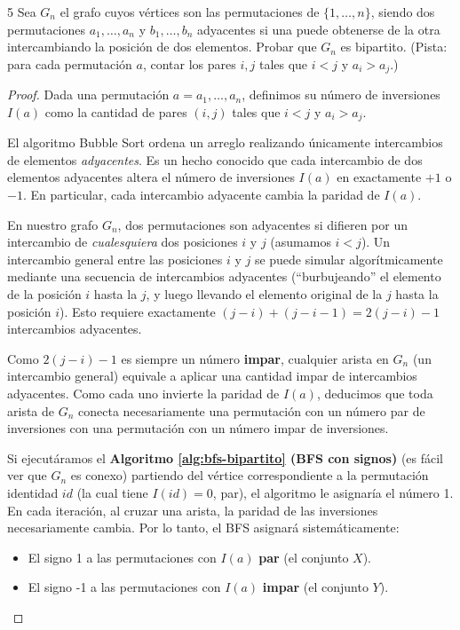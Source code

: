 \begin{ejercicio}{5}
    Sea \( G_n \) el grafo cuyos vértices son las permutaciones de \( \{1, \ldots, n\} \), siendo dos permutaciones \( a_1, \ldots, a_n \) y \( b_1, \ldots, b_n \) adyacentes si una puede obtenerse de la otra intercambiando la posición de dos elementos. Probar que \( G_n \) es bipartito. (Pista: para cada permutación \( a \), contar los pares \( i, j \) tales que \( i < j \) y \( a_i > a_j \).)
\end{ejercicio}
\begin{proof}
    Dada una permutación \(a = a_1, \ldots, a_n\), definimos su número de inversiones \( I(a) \) como la cantidad de pares \((i, j)\) tales que \(i < j\) y \(a_i > a_j\).

    El algoritmo Bubble Sort ordena un arreglo realizando únicamente intercambios de elementos \emph{adyacentes}. Es un hecho conocido que cada intercambio de dos elementos adyacentes altera el número de inversiones \(I(a)\) en exactamente \(+1\) o \(-1\). En particular, cada intercambio adyacente cambia la paridad de \(I(a)\).

    En nuestro grafo \(G_n\), dos permutaciones son adyacentes si difieren por un intercambio de \emph{cualesquiera} dos posiciones \(i\) y \(j\) (asumamos \(i < j\)). Un intercambio general entre las posiciones \(i\) y \(j\) se puede simular algorítmicamente mediante una secuencia de intercambios adyacentes (``burbujeando'' el elemento de la posición \(i\) hasta la \(j\), y luego llevando el elemento original de la \(j\) hasta la posición \(i\)). Esto requiere exactamente \((j-i) + (j-i-1) = 2(j-i) - 1\) intercambios adyacentes.

    Como \(2(j-i) - 1\) es siempre un número \textbf{impar}, cualquier arista en \(G_n\) (un intercambio general) equivale a aplicar una cantidad impar de intercambios adyacentes. Como cada uno invierte la paridad de \(I(a)\), deducimos que toda arista de \(G_n\) conecta necesariamente una permutación con un número par de inversiones con una permutación con un número impar de inversiones.

    Si ejecutáramos el \textbf{Algoritmo \ref{alg:bfs-bipartito} (BFS con signos)} (es fácil ver que \( G_n \) es conexo) partiendo del vértice correspondiente a la permutación identidad \( id \) (la cual tiene \(I(id) = 0\), par), el algoritmo le asignaría el número 1. En cada iteración, al cruzar una arista, la paridad de las inversiones necesariamente cambia. Por lo tanto, el BFS asignará sistemáticamente:
    \begin{itemize}
        \item El signo 1 a las permutaciones con \( I(a)\) \textbf{par} (el conjunto \(X\)).
        \item El signo -1 a las permutaciones con \(I(a)\) \textbf{impar} (el conjunto \(Y\)).
    \end{itemize}


\end{proof}
